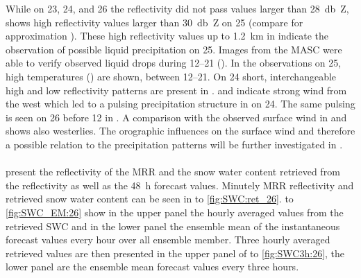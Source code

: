 While on \num{23}, \num{24}, and \SI{26}{\dec} the reflectivity did not pass values larger than \SI{28}{\decibel Z},  shows high reflectivity values larger than \SI{30}{\decibel Z} on \SI{25}{\dec} (compare for approximation ). 
These high reflectivity values up to \SI{1.2}{\km} in  indicate the observation of possible liquid precipitation on \SI{25}{\dec}. Images from the MASC were able to verify observed liquid drops during \SIrange{12}{21}{\UTC} (). 
In the observations on \SI{25}{\dec}, %
high temperatures () %
are shown, between \SIrange{12}{21}{\UTC}. %
On \SI{24}{\dec} short, interchangeable high and low reflectivity patterns are present in .  and  indicate strong wind from the west which led to a pulsing precipitation structure in  on \SI{24}{\dec}. 
The same pulsing is seen on \SI{26}{\dec} before \SI{12}{\UTC} in . A comparison with the observed surface wind in  and  shows also westerlies.  The orographic influences on the surface wind and therefore a possible relation to the precipitation patterns will be further investigated in . 
\\
\\
 present the reflectivity of the MRR and the snow water content retrieved from the reflectivity as well as the \SI{48}{\hour} forecast values. Minutely MRR reflectivity and retrieved snow water content can be seen in  to \ref{fig:SWC:ret_26}.  to \ref{fig:SWC_EM:26} show in the upper panel the hourly averaged values from the retrieved SWC and in the lower panel the ensemble mean of the instantaneous forecast values every hour over all ensemble member.   
Three hourly averaged retrieved values are then presented in the upper panel of  to \ref{fig:SWC3h:26}, the lower panel are the ensemble mean forecast values every three hours.
